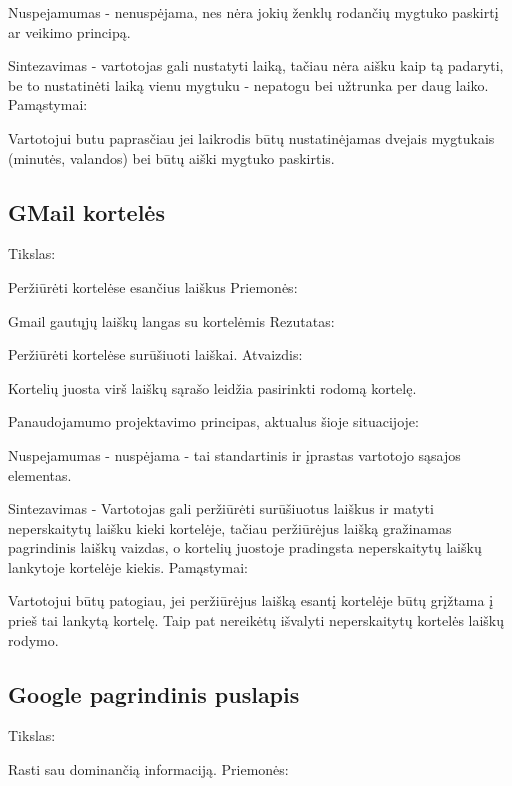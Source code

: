 ﻿\documentclass[a4paper, 12pt]{article}
\begin{document}
		Nuspejamumas - nenuspėjama, nes nėra jokių ženklų rodančių mygtuko paskirtį ar veikimo principą.
		
		Sintezavimas - vartotojas gali nustatyti laiką, tačiau nėra aišku kaip tą padaryti, be
		to nustatinėti laiką vienu mygtuku - nepatogu bei užtrunka per daug laiko.\newline		
		Pamąstymai:
		
		Vartotojui butu paprasčiau jei laikrodis būtų nustatinėjamas dvejais mygtukais (minutės, valandos)
		bei būtų aiški mygtuko paskirtis.
		
	\subsection{GMail kortelės}
		Tikslas:
		
		Peržiūrėti kortelėse esančius laiškus\newline
		Priemonės:
		
		Gmail gautųjų laiškų langas su kortelėmis\newline
		Rezutatas:
		
		Peržiūrėti kortelėse surūšiuoti laiškai.\newline
		Atvaizdis:
		
		Kortelių juosta virš laiškų sąrašo leidžia pasirinkti rodomą kortelę.\newline
		
		Panaudojamumo projektavimo principas, aktualus šioje situacijoje:
		
		Nuspejamumas - nuspėjama - tai standartinis ir įprastas vartotojo sąsajos elementas.
		
		Sintezavimas - Vartotojas gali peržiūrėti surūšiuotus laiškus ir matyti neperskaitytų laišku kieki kortelėje, tačiau peržiūrėjus laišką
		gražinamas pagrindinis laiškų vaizdas, o kortelių juostoje pradingsta neperskaitytų laiškų lankytoje kortelėje kiekis.\newline		
		Pamąstymai:
		
		Vartotojui būtų patogiau, jei peržiūrėjus laišką esantį kortelėje būtų grįžtama į prieš tai lankytą kortelę.
		Taip pat nereikėtų išvalyti neperskaitytų kortelės laiškų rodymo.

	\subsection{Google pagrindinis puslapis}
		Tikslas:

		Rasti sau dominančią informaciją.\newline
		Priemonės:
\end{document}
